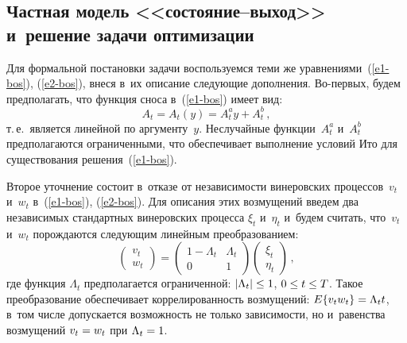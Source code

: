 \begin{multicols}{2}
     
\section{Частная модель <<состояние--выход>> и~решение задачи 
оптимизации}

     Для формальной постановки задачи воспользуемся теми же 
уравнениями~(\ref{e1-bos}), (\ref{e2-bos}), внеся в~их описание следующие 
дополнения. Во-пер\-вых, будем предполагать, что функция сноса  
в~(\ref{e1-bos}) имеет вид:
     \begin{equation}
     A_t=A_t(y)=A_t^a y+A_t^b\,,
     \label{e4-bos}
\end{equation}
т.\,е.\ является линейной по аргументу~$y$. Неслучайные функции~$A_t^a$ 
и~$A_t^b$ предполагаются ограниченными, что обеспечивает выполнение 
условий Ито для существования решения~(\ref{e1-bos}).

     Второе уточнение состоит в~отказе от независимости винеровских 
процессов~$v_t$ и~$w_t$ в~(\ref{e1-bos}), (\ref{e2-bos}). Для описания этих 
возмущений введем два независимых стандартных винеровских процесса 
$\xi_t$ и~$\eta_t$ и~будем считать, что~$v_t$ и~$w_t$ порождаются следующим 
линейным преобразованием:
     \begin{equation}
     \begin{pmatrix}
     v_t\\ w_t \end{pmatrix} = \begin{pmatrix}
     1-\Lambda_t & \Lambda_t\\
     0& 1
     \end{pmatrix}
      \begin{pmatrix}
     \xi_t \\ \eta_t
     \end{pmatrix}\,,
     \label{e5-bos}
     \end{equation}
где функция $\Lambda_t$ предполагается ограниченной: $\vert \Lambda_t\vert 
\hm\leq 1$, $0\hm\leq t\hm\leq T$. Такое преобразование обеспечивает 
коррелированность возмущений: $E\{v_tw_t\}\hm= \Lambda_t t$, в~том числе 
допускается возможность не только зависимости, но и~равенства возмущений 
$v_t\hm=w_t$ при $\Lambda_t\hm=1$.


\end{multicols}
